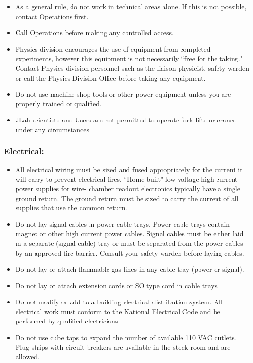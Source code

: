 \begin{itemize}
\item As a general rule, do not work in technical areas alone. If this is not possible, contact 
Operations first.

\item Call Operations before making any controlled access. 

\item Physics division encourages the use of equipment from completed experiments, however 
this equipment is not necessarily ``free for the taking." Contact Physics division personnel 
such as the liaison physicist, safety warden or call the Physics Division Office before 
taking any equipment.

\item Do not use machine shop tools or other power equipment unless you are properly trained 
or qualified.

\item JLab scientists and Users are not permitted to operate fork lifts or cranes under any 
circumstances.
\end{itemize}

\subsubsection*{Electrical:}

\begin{itemize}

\item All electrical wiring must be sized and fused appropriately for the current it will carry to 
prevent electrical fires. ``Home built" low-voltage high-current power supplies for wire-
chamber readout electronics typically have a single ground return. The ground return 
must be sized to carry the current of all supplies that use the common return.

\item Do not lay signal cables in power cable trays. Power cable trays contain magnet or other 
high current power cables. Signal cables must be either laid in a separate (signal cable) 
tray or must be separated from the power cables by an approved fire barrier. Consult your 
safety warden before laying cables.

\item Do not lay or attach flammable gas lines in any cable tray (power or signal).

\item Do not lay or attach extension cords or SO type cord in cable trays.

\item Do not modify or add to a building electrical distribution system. All electrical work must 
conform to the National Electrical Code and be performed by qualified electricians.

\item Do not use cube taps to expand the number of available 110 VAC outlets.  Plug strips 
with circuit breakers are available in the stock-room and are allowed.
\end{itemize}

